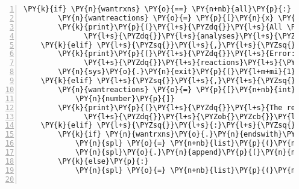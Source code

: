 \begin{Verbatim}[commandchars=\\\{\},fontsize=\small,numbers=left,firstnumber=1,stepnumber=2,firstline=2]
    \PY{k}{if} \PY{n}{wantrxns} \PY{o}{==} \PY{n+nb}{all}\PY{p}{:}
        \PY{n}{wantreactions} \PY{o}{=} \PY{p}{[}\PY{n}{x} \PY{o}{+} \PY{l+m+mi}{1} \PY{k}{for} \PY{n}{x} \PY{o+ow}{in} \PY{n+nb}{range}\PY{p}{(}\PY{n}{numRxns}\PY{p}{)}\PY{p}{]}
        \PY{k}{print}\PY{p}{(}\PY{l+s}{\PYZdq{}}\PY{l+s}{All \PYZob{}\PYZcb{} reactions are considered in these }\PY{l+s}{\PYZdq{}}
              \PY{l+s}{\PYZdq{}}\PY{l+s}{analyses}\PY{l+s}{\PYZdq{}}\PY{o}{.}\PY{n}{format}\PY{p}{(}\PY{n}{numRxns}\PY{p}{)}\PY{p}{)}
    \PY{k}{elif} \PY{l+s}{\PYZsq{}}\PY{l+s}{,}\PY{l+s}{\PYZsq{}} \PY{o+ow}{in} \PY{n}{wantrxns} \PY{o+ow}{and} \PY{l+s}{\PYZsq{}}\PY{l+s}{:}\PY{l+s}{\PYZsq{}} \PY{o+ow}{in} \PY{n}{wantrxns}\PY{p}{:}
        \PY{k}{print}\PY{p}{(}\PY{l+s}{\PYZdq{}}\PY{l+s}{Error: use one of commas or colons to separate the wanted }\PY{l+s}{\PYZdq{}}
              \PY{l+s}{\PYZdq{}}\PY{l+s}{reactions}\PY{l+s}{\PYZdq{}}\PY{p}{)}
        \PY{n}{sys}\PY{o}{.}\PY{n}{exit}\PY{p}{(}\PY{l+m+mi}{1}\PY{p}{)}
    \PY{k}{elif} \PY{l+s}{\PYZsq{}}\PY{l+s}{,}\PY{l+s}{\PYZsq{}} \PY{o+ow}{in} \PY{n}{wantrxns}\PY{p}{:}
        \PY{n}{wantreactions} \PY{o}{=} \PY{p}{[}\PY{n+nb}{int}\PY{p}{(}\PY{n}{number}\PY{p}{)} \PY{k}{for} \PY{n}{number} \PY{o+ow}{in} \PY{n}{wantrxns}\PY{o}{.}\PY{n}{split}\PY{p}{(}\PY{l+s}{\PYZsq{}}\PY{l+s}{,}\PY{l+s}{\PYZsq{}}\PY{p}{)} \PY{k}{if}
            \PY{n}{number}\PY{p}{]}
        \PY{k}{print}\PY{p}{(}\PY{l+s}{\PYZdq{}}\PY{l+s}{The reactions considered in these analyses are }\PY{l+s}{\PYZdq{}}
              \PY{l+s}{\PYZdq{}}\PY{l+s}{\PYZob{}\PYZcb{}}\PY{l+s}{\PYZdq{}}\PY{o}{.}\PY{n}{format}\PY{p}{(}\PY{n}{wantreactions}\PY{p}{)}\PY{p}{)}
    \PY{k}{elif} \PY{l+s}{\PYZsq{}}\PY{l+s}{:}\PY{l+s}{\PYZsq{}} \PY{o+ow}{in} \PY{n}{wantrxns}\PY{p}{:}
        \PY{k}{if} \PY{n}{wantrxns}\PY{o}{.}\PY{n}{endswith}\PY{p}{(}\PY{l+s}{\PYZsq{}}\PY{l+s}{:}\PY{l+s}{\PYZsq{}}\PY{p}{)} \PY{o+ow}{or} \PY{n}{wantrxns}\PY{o}{.}\PY{n}{endswith}\PY{p}{(}\PY{l+s}{\PYZsq{}}\PY{l+s}{end}\PY{l+s}{\PYZsq{}}\PY{p}{)}\PY{p}{:}
            \PY{n}{spl} \PY{o}{=} \PY{n+nb}{list}\PY{p}{(}\PY{n+nb}{map}\PY{p}{(}\PY{n+nb}{int}\PY{p}{,} \PY{n}{wantrxns}\PY{o}{.}\PY{n}{split}\PY{p}{(}\PY{l+s}{\PYZsq{}}\PY{l+s}{:}\PY{l+s}{\PYZsq{}}\PY{p}{)}\PY{p}{[}\PY{p}{:}\PY{o}{\PYZhy{}}\PY{l+m+mi}{1}\PY{p}{]}\PY{p}{)}\PY{p}{)}
            \PY{n}{spl}\PY{o}{.}\PY{n}{append}\PY{p}{(}\PY{n}{numRxns}\PY{p}{)}
        \PY{k}{else}\PY{p}{:}
            \PY{n}{spl} \PY{o}{=} \PY{n+nb}{list}\PY{p}{(}\PY{n+nb}{map}\PY{p}{(}\PY{n+nb}{int}\PY{p}{,} \PY{n}{wantrxns}\PY{o}{.}\PY{n}{split}\PY{p}{(}\PY{l+s}{\PYZsq{}}\PY{l+s}{:}\PY{l+s}{\PYZsq{}}\PY{p}{)}\PY{p}{)}\PY{p}{)}


\end{Verbatim}
